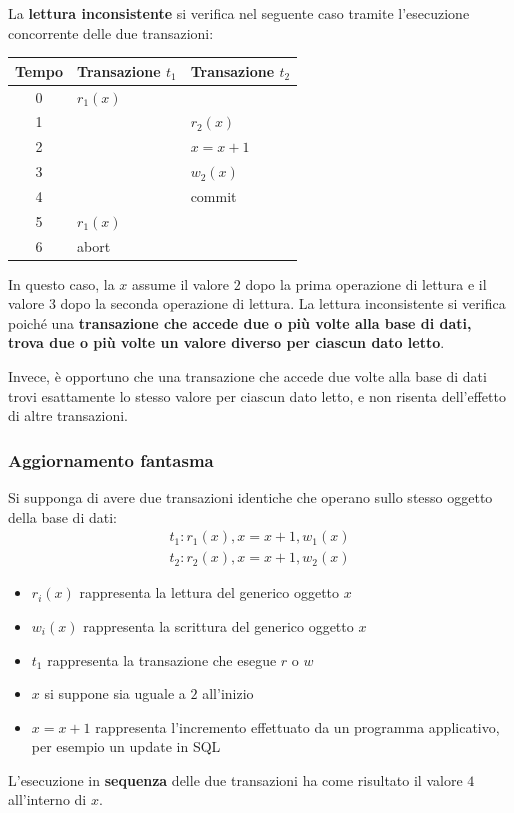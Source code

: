 \documentclass[a4paper]{article}
\begin{document}
	\noindent
	La \textcolor{Red3}{\textbf{lettura inconsistente}} si verifica nel seguente caso tramite l'esecuzione concorrente delle due transazioni:
	\begin{table}[!htbp]
		\centering
		\begin{tabular}{@{} c l l @{}}
			\toprule
			Tempo & Transazione $t_{1}$ & Transazione $t_{2}$ \\
			\midrule
			0	& $r_{1}\left(x\right)$			& \\
			1	&								& $r_{2}\left(x\right)$ \\
			2	& 								& $x = x + 1$ \\
			3	& 								& $w_{2}\left(x\right)$ \\
			4	&								& \textsf{commit} \\
			5	& $r_{1}\left(x\right)$			& \\
			6	& \textsf{abort}				& \\
			\bottomrule
		\end{tabular}
	\end{table}
	
	\noindent
	In questo caso, la $x$ assume il valore $2$ dopo la prima operazione di lettura e il valore $3$ dopo la seconda operazione di lettura. La lettura inconsistente si verifica poiché una \textbf{transazione che accede due o più volte alla base di dati, trova due o più volte un valore diverso per ciascun dato letto}.\newline
	
	\noindent
	Invece, è opportuno che una transazione che accede due volte alla base di dati trovi esattamente lo stesso valore per ciascun dato letto, e non risenta dell'effetto di altre transazioni.\newpage
	
	\subsubsection{Aggiornamento fantasma}\label{par: aggiornamento fantasma}
	
	Si supponga di avere due transazioni identiche che operano sullo stesso oggetto della base di dati:
	\begin{gather*}
		t_{1} : r_{1}\left(x\right), x = x + 1, w_{1}\left(x\right) \\
		t_{2} : r_{2}\left(x\right), x = x + 1, w_{2}\left(x\right)
	\end{gather*}
	\begin{itemize}
		\item $r_{i}\left(x\right)$ rappresenta la lettura del generico oggetto $x$
		\item $w_{i}\left(x\right)$ rappresenta la scrittura del generico oggetto $x$
		\item $t_{1}$ rappresenta la transazione che esegue $r$ o $w$
		\item $x$ si suppone sia uguale a $2$ all'inizio
		\item $x = x+1$ rappresenta l'incremento effettuato da un programma applicativo, per esempio un \textsf{update} in SQL
	\end{itemize}
	L'esecuzione in \textbf{sequenza} delle due transazioni ha come risultato il valore $4$ all'interno di $x$.\newline
	
\end{document}
